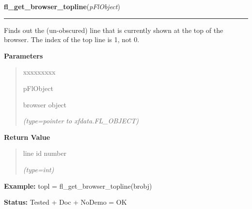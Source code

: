     \vspace{0.5ex}

\hspace{.8\funcindent}\begin{boxedminipage}{\funcwidth}

    \raggedright \textbf{fl\_get\_browser\_topline}(\textit{pFlObject})

    \vspace{-1.5ex}

    \rule{\textwidth}{0.5\fboxrule}
\setlength{\parskip}{2ex}
    Finds out the (un-obscured) line that is currently shown at the top of 
    the browser. The index of the top line is 1, not 0.

\setlength{\parskip}{1ex}
      \textbf{Parameters}
      \vspace{-1ex}

      \begin{quote}
        \begin{Ventry}{xxxxxxxxx}

          \item[pFlObject]

          browser object

            {\it (type=pointer to xfdata.FL\_OBJECT)}

        \end{Ventry}

      \end{quote}

      \textbf{Return Value}
    \vspace{-1ex}

      \begin{quote}
      line id number

      {\it (type=int)}

      \end{quote}

\textbf{Example:} topl = fl\_get\_browser\_topline(brobj)



\textbf{Status:} Tested + Doc + NoDemo = OK



    \end{boxedminipage}

    \label{xformslib:flbrowser:fl_get_browser}

    \vspace{0.5ex}

